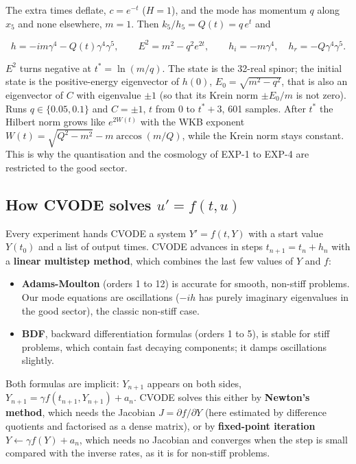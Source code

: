 \documentclass[11pt]{article}
\begin{document}
The extra times deflate, $c=e^{-t}$ ($H=1$), and the mode has momentum $q$ along $x_5$ and none elsewhere, $m=1$. Then $k_5/h_5=Q(t)=q\,e^{t}$ and

\[
h=-im\gamma^4-Q(t)\gamma^4\gamma^5,\qquad E^2=m^2-q^2e^{2t},\qquad h_i=-m\gamma^4,\quad h_r=-Q\gamma^4\gamma^5 .
\]

$E^2$ turns negative at $t^*=\ln(m/q)$. The state is the 32-real spinor; the initial state is the positive-energy eigenvector of $h(0)$, $E_0=\sqrt{m^2-q^2}$, that is also an eigenvector of $C$ with eigenvalue $\pm1$ (so that its Krein norm $\pm E_0/m$ is not zero). Runs $q\in\{0.05,0.1\}$ and $C=\pm1$, $t$ from 0 to $t^*+3$, 601 samples. After $t^*$ the Hilbert norm grows like $e^{2W(t)}$ with the WKB exponent $W(t)=\sqrt{Q^2-m^2}-m\arccos(m/Q)$, while the Krein norm stays constant. This is why the quantisation and the cosmology of EXP-1 to EXP-4 are restricted to the good sector.

\subsection{How CVODE solves \texorpdfstring{$u'=f(t,u)$}{u'=f(t,u)}}

Every experiment hands CVODE a system $Y'=f(t,Y)$ with a start value $Y(t_0)$ and a list of output times. CVODE advances in steps $t_{n+1}=t_n+h_n$ with a \textbf{linear multistep method}, which combines the last few values of $Y$ and $f$:

\begin{itemize}
\item \textbf{Adams-Moulton} (orders 1 to 12) is accurate for smooth, non-stiff problems. Our mode equations are oscillations ($-ih$ has purely imaginary eigenvalues in the good sector), the classic non-stiff case.
\item \textbf{BDF}, backward differentiation formulas (orders 1 to 5), is stable for stiff problems, which contain fast decaying components; it damps oscillations slightly.
\end{itemize}

Both formulas are implicit: $Y_{n+1}$ appears on both sides, $Y_{n+1}=\gamma f(t_{n+1},Y_{n+1})+a_n$. CVODE solves this either by \textbf{Newton's method}, which needs the Jacobian $J=\partial f/\partial Y$ (here estimated by difference quotients and factorised as a dense matrix), or by \textbf{fixed-point iteration} $Y\leftarrow\gamma f(Y)+a_n$, which needs no Jacobian and converges when the step is small compared with the inverse rates, as it is for non-stiff problems.
\end{document}
